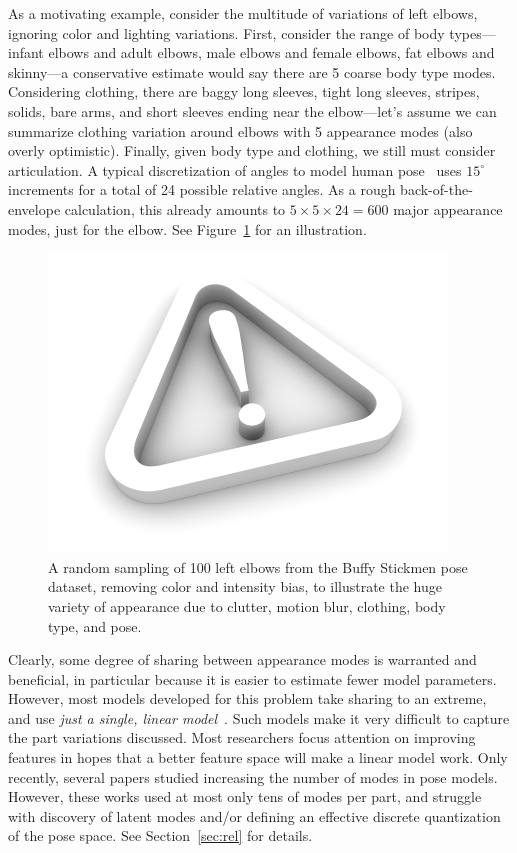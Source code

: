 As a motivating example, consider the multitude of variations of left elbows, 
ignoring color and lighting variations.  First, consider the range of body 
types---infant elbows and adult elbows, male elbows and female elbows, fat 
elbows and skinny---a conservative estimate would say there are 5 coarse body 
type modes.  Considering clothing, there are baggy long sleeves, tight long 
sleeves, stripes, solids, bare arms, and short sleeves ending near the 
elbow---let's assume we can summarize clothing variation around elbows with 5 
appearance modes (also overly optimistic).  Finally, given body type and 
clothing, we still must consider articulation.  A typical discretization of 
angles to model human pose~\cite{felzps,devacrf,eichner09,sapp2010cascades} 
uses $15^\circ$ increments for a total of 24 possible relative angles.  As a 
rough back-of-the-envelope calculation, this already amounts to $5 \times 5 
\times 24 = 600$ major appearance modes, just for the elbow.  See 
Figure~\ref{fig:lelbs} for an illustration.

\begin{figure}[b!]
\centering
\includegraphics[width=0.99\linewidth]{figs/empty.jpg}
\caption{\small \label{fig:lelbs} A random sampling of 100 left elbows from the 
Buffy Stickmen pose dataset, removing color and intensity bias, to illustrate 
the huge variety of appearance due to clutter, motion blur, clothing, body 
type, and pose.}
\end{figure}

Clearly, some degree of sharing between appearance modes is warranted and 
beneficial, in particular because it is easier to estimate fewer model 
parameters.  However, most models developed for this problem take sharing to an 
extreme, and use {\em just a single, linear 
model}~\cite{devacrf,eichner09,sapp2010cascades,sapp2011,andriluka09,ddtran}.  
Such models make it very difficult to capture the part variations discussed.  
Most researchers focus attention on improving features in hopes that a better 
feature space will make a linear model work.  Only recently, several papers 
studied increasing the number of modes in pose models. However, these works 
used at most only tens of modes per part, and struggle with discovery of latent 
modes and/or defining an effective discrete quantization of the pose space.  
See Section~\ref{sec:rel} for details.


